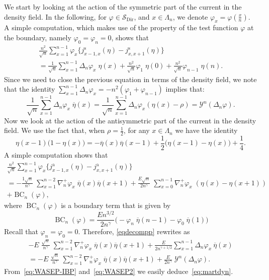 \documentclass[10pt]{amsart}
\theoremstyle{definition}\newtheorem{defi}[theo]{Definition}\newtheorem{rema}[theo]{Remark}\newtheorem{exam}[theo]{Example}\newtheorem{exem}[theo]{Example}\newtheorem{nota}[theo]{Notation}
\DeclareMathOperator{\Dir}{Dir}
\DeclareMathOperator{\BC}{BC}
\newcommand*{\rms}{\mathrm{s}}
\newcommand*{\rma}{\mathrm{a}}
\newcommand{\mc}[1]{{\mathcal #1}}
\renewcommand{\mc}[1]{{\mathcal #1}}
\newcommand{\SD}{\ensuremath{\mc S_{\Dir}}}
\renewcommand{\bar}{\overline}
\begin{document}
We start by looking at the action of the symmetric part of the current in the density field. In the following, for $\varphi \in \SD$, and $x\in\Lambda_n$, we denote $\varphi_x=\varphi(\frac x n)$. A simple computation, which makes use of the property of the test function $\varphi$ at the boundary, namely $\varphi_0=\varphi_n=0$, shows that
\begin{multline}
\frac{n^2}{\sqrt n}\sum_{x=1}^{n-1}\varphi_x \big\{j_{x-1,x}^{\rms}(\eta)-j_{x,x+1}^{\rms}(\eta)\big\} \\
=\frac{1}{\sqrt n}\sum_{x=1}^{n-1}\Delta_n\varphi_x\;\eta(x)+ \frac{n^2}{\sqrt n}\varphi_1\;\eta(0)+\frac{n^2}{\sqrt n}\varphi_{n-1}\;\eta(n). \label{eq:eq}
\end{multline}
Since we need to close the previous equation in terms of the density field, we note that the identity $ \sum_{x=1}^{n-1}\Delta_n\varphi_x=-n^2(\varphi_1+\varphi_{n-1})$ implies that:
\begin{equation}\label{eq:WASEP-IBP}
\frac{1}{\sqrt n}\sum_{x=1}^{n-1}\Delta_n\varphi_x\;\bar\eta(x)=
\frac{1}{\sqrt n}\sum_{x=1}^{n-1}\Delta_n\varphi_x(\eta(x)-\rho)=\mathcal{Y}^n (\Delta_n\varphi).
\end{equation}
Now we look at the action of the antisymmetric part of the current in the density field. We use the fact that, when $\rho=\frac12$, for any $x\in\Lambda_n$ we have the identity
\begin{equation}
\eta(x-1)\big(1-\eta(x)\big)= - \bar\eta(x)\bar\eta(x-1) + \frac{1}{2}\big(\eta(x-1)-\eta(x)\big) + \frac{1}{4}.\label{eq:ide}
\end{equation}
A simple computation shows that
\begin{multline}
\frac{n^2}{\sqrt n}\sum_{x=1}^{n-1} \varphi_x \big\{j_{x-1,x}^{\rma}(\eta)-j_{x,x+1}^{\rma}(\eta)\big\}\label{eqdecompp}
\\ =-\frac{1\sqrt n}{n^{\gamma}}\; \sum_{x=1}^{n-2}\nabla_n^+\varphi_x\; \bar{\eta}(x)\bar{\eta}(x+1) + \frac{E\sqrt n}{2n^{\gamma}}\; \sum_{x=0}^{n-1}\nabla_n^+\varphi_x\;(\eta(x)-\eta(x+1))\\
+ \BC_n(\varphi),
\end{multline}
where $\BC_n(\varphi)$ is a boundary term that is given by
\[
\BC_n(\varphi) = \frac{En^{3/2}}{2n^{\gamma}} \Big(-\varphi_n\;\bar\eta(n-1) - \varphi_0\; \bar\eta(1)\Big)
\]
Recall that $\varphi_n=\varphi_0=0$. Therefore, \eqref{eqdecompp} rewrites as
\begin{multline}
-E \; \frac{\sqrt n}{n^\gamma}\; \sum_{x=1}^{n-2}\nabla_n^+\varphi_x\; \bar{\eta}(x)\bar{\eta}(x+1) + \frac{E}{2n^{\gamma+1/2}} \sum_{x=1}^{n-1}\Delta_n\varphi_x\:\bar\eta(x) \\
= -E \; \frac{\sqrt n}{n^\gamma}\; \sum_{x=1}^{n-2}\nabla_n^+\varphi_x\; \bar{\eta}(x)\bar{\eta}(x+1) + \frac{E}{2n^\gamma}\; \mc Y^n(\Delta_n \varphi).\label{eq:WASEP2}
\end{multline}
From~\eqref{eq:WASEP-IBP} and~\eqref{eq:WASEP2} we easily deduce~\eqref{eq:martdyn}.
\end{document}

